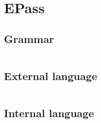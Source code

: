 \documentclass[12pt, openany]{memoir}
\begin{document}
\appendix
\chapter{EPass} 
\section{Grammar} \label{sec:grammar}
\inputminted{text}{code/grammar.txt}
\section{External language} \label{sec:el}
\inputminted{ocaml}{code/el.ml}
\section{Internal language} \label{sec:il}
\inputminted{ocaml}{code/il.ml}
\backmatter

\printbibliography
\end{document}
